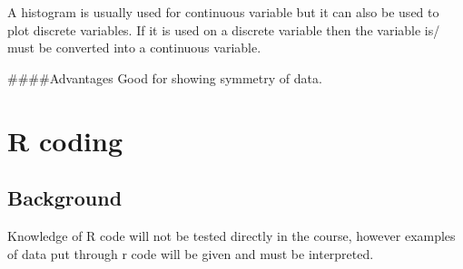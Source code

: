 \documentclass[]{article}
\begin{document}
A histogram is usually used for continuous variable but it can also be
used to plot discrete variables. If it is used on a discrete variable
then the variable is/ must be converted into a continuous variable.

\#\#\#\#Advantages Good for showing symmetry of data.

\hypertarget{r-coding}{%
\section{R coding}\label{r-coding}}

\hypertarget{background-1}{%
\subsection{Background}\label{background-1}}

Knowledge of R code will not be tested directly in the course, however
examples of data put through r code will be given and must be
interpreted.
\end{document}
